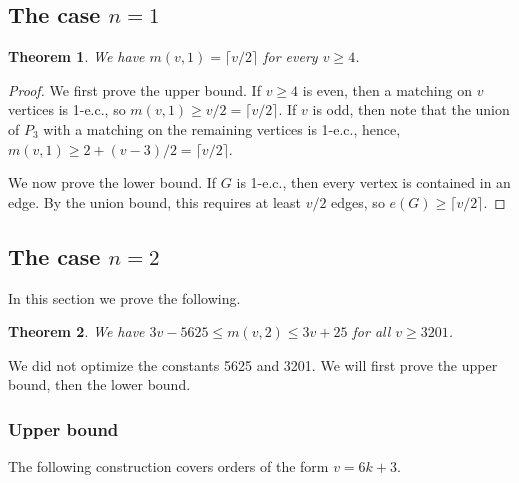 \documentclass{article}
\newtheorem{thm}{Theorem}
\newtheorem{prop}[thm]{Proposition}
\theoremstyle{definition}
\begin{document}
\subsection{The case $n=1$}

\begin{thm}
    We have $m(v,1)=\lceil v/2\rceil$ for every $v\ge 4$.
\end{thm}
\begin{proof}
    We first prove the upper bound. If $v\ge 4$ is even, then a matching on $v$ vertices is 1-e.c., so $m(v,1)\ge v/2=\lceil v/2\rceil.$ If $v$ is odd, then note that the union of $P_3$ with a matching on the remaining vertices is 1-e.c., hence, $m(v,1)\ge 2+(v-3)/2=\lceil v/2\rceil.$
    
    We now prove the lower bound. If $G$ is 1-e.c., then every vertex is contained in an edge. By the union bound, this requires at least $v/2$ edges, so $e(G)\ge\lceil v/2\rceil$.
\end{proof}

\subsection{The case $n=2$}

In this section we prove the following.

\begin{thm} \label{Theorem m(v,2)}
    We have $3v-5625\le m(v,2)\le 3v+25$ for all $v\ge 3201$.
\end{thm}

We did not optimize the constants 5625 and 3201. We will first prove the upper bound, then the lower bound.

\subsubsection{Upper bound}

The following construction covers orders of the form $v=6k+3$.
\end{document}
